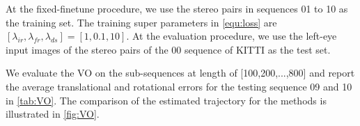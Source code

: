 At the fixed-finetune procedure, we use the stereo pairs in sequences 01 to 10 as the training set. The training super parameters in \cref{equ:loss} are $[\lambda_{ir},\lambda_{fr},\lambda_{ds}] = [1,0.1,10]$. At the evaluation procedure, we use the left-eye input images of the stereo pairs of the 00 sequence of KITTI as the test set.

  We evaluate the VO on the sub-sequences at length of [100,200,...,800] and report the average translational and rotational errors for the testing sequence 09 and 10 in \cref{tab:VO}.  The comparison of the estimated trajectory for the methods is illustrated in \cref{fig:VO}.


  \begin{figure}[t]
    \centering  

\end{figure}
